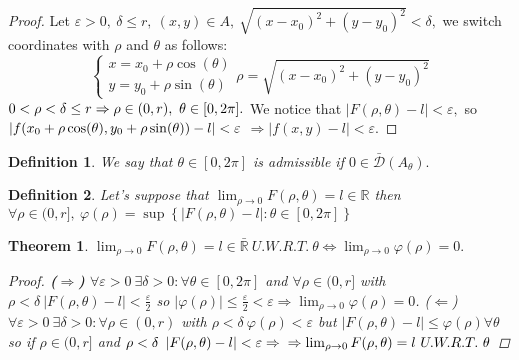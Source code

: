\documentclass{article}
\newtheorem{theorem}{Theorem}
\newtheorem{definition}{Definition}
\begin{document}
\begin{proof}
        Let $\varepsilon > 0, \ \delta \leq r, \ (x,y) \in A, \ \sqrt{(x - x_0)^2 + (y - y_0)^2} < \delta,$ we switch coordinates with $\rho$ and $\theta$ as follows:
            \begin{equation*}
                \begin{cases}
                    x = x_0 + \rho \cos(\theta) \\
                    y = y_0 + \rho \sin(\theta)  
                \end{cases} \rho = \sqrt{(x - x_0)^2 + (y - y_0)^2} 
            \end{equation*}
        $0< \rho < \delta \leq r \Rightarrow \rho \in (0,r), \ \theta \in [0,2\pi]. \\$ 
        We notice that $ \left\lvert F(\rho, \theta) - l \right\rvert < \varepsilon,$ so $ \left\lvert f(x_0 + \rho \cos(\theta), y_0 + \rho \sin(\theta)) - l \right\rvert < \varepsilon \\$
        $ \Rightarrow  \left\lvert f(x,y) - l \right\rvert < \varepsilon.$
    \end{proof}
    \begin{definition}
        We say that $\theta \in [0,2\pi]$ is admissible if $ 0\in \bar{\mathcal{D}}(A_\theta).$
    \end{definition}
    \begin{definition}
        Let's suppose that $\lim_{\rho \to 0} F(\rho, \theta) = l \in \mathbb{R}$ then $\forall \rho \in (0,r], \ \varphi(\rho) = \sup \left\{\left\lvert F(\rho, \theta) - l \right\rvert : \theta \in [0,2\pi]\right\} $
    \end{definition}
    \begin{theorem}
        $\lim_{\rho \to 0} F(\rho, \theta) = l \in \bar{\mathbb{R}} \ U.W.R.T. \ \theta \Longleftrightarrow \lim_{\rho \to 0 } \varphi(\rho) = 0.$
        \begin{proof}
            \textbf{($\Rightarrow$)} $\forall \varepsilon > 0 \ \exists \delta > 0 : \forall \theta \in [0,2\pi] $ and $ \forall \rho \in (0,r]$ with $\rho < \delta \ \left\lvert F(\rho, \theta) - l \right\rvert < \frac{\varepsilon}{2}$ so $\left\lvert \varphi (\rho) \right\rvert \leq \frac{\varepsilon}{2} < \varepsilon \Rightarrow \lim_{\rho \to 0} \varphi (\rho) = 0$. ($\Leftarrow$) $\forall \varepsilon > 0 \ \exists \delta > 0: \forall \rho \in (0,r)$ with $\rho < \delta \ \varphi (\rho) < \varepsilon$ but $\left\lvert F(\rho, \theta) - l \right\rvert \leq \varphi (\rho) \forall \theta$ so if $\rho \in (0,r]$ and $\rho < \delta \ \left\lvert F(\rho, \theta) - l \right\rvert < \varepsilon \Rightarrow \\ \Rightarrow \lim_{\rho \to 0} F(\rho,\theta) = l \ U.W.R.T. \ \theta$  
        \end{proof}
    \end{theorem}
\end{document}
